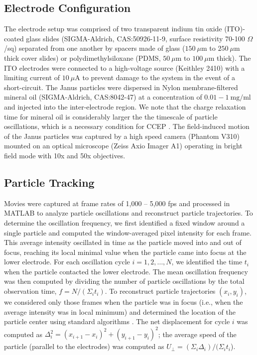 \subsection{Electrode Configuration}

The electrode setup was comprised of two transparent  indium tin oxide (ITO)-coated glass slides (SIGMA-Aldrich, CAS:50926-11-9, surface resistivity 70-100 $\Omega$/sq) separated from one another by spacers made of glass ($150~\mu\text{m}$ to $250~\mu\text{m}$ thick cover slides) or polydimethylsiloxane (PDMS, $50~\mu\text{m}$ to $100~\mu\text{m}$ thick).
The ITO electrodes were connected to a high-voltage source (Keithley 2410) with a limiting current of $10~\mu\text{A}$ to prevent damage to the system in the event of a short-circuit.
The Janus particles were dispersed in Nylon membrane-filtered mineral oil (SIGMA-Aldrich, CAS:8042-47) at a concentration of $0.01-1~\text{mg/ml}$ and injected into the inter-electrode region.
We note that the charge relaxation time for mineral oil is considerably larger the the timescale of particle oscillations, which is a necessary condition for CCEP \cite{cartier2014microfluidic}. 
The field-induced motion of the Janus particles was captured by a high speed camera (Phantom V310) mounted on an optical microscope (Zeiss Axio Imager A1) operating in bright field mode with 10x and 50x objectives.

\subsection{Particle Tracking}

Movies were captured at frame rates of 1,000 -- 5,000 fps and processed in MATLAB to analyze particle oscillations and reconstruct particle trajectories. 
To determine the oscillation frequency, we first identified a fixed window around a single particle and computed the window-averaged pixel intensity for each frame.
This average intensity oscillated in time as the particle moved into and out of focus, reaching its local minimal value when the particle came into focus at the lower electrode.
For each oscillation cycle $i=1,2,\dots, N$, we identified the time $t_i$ when the particle contacted the lower electrode. 
The mean oscillation frequency was then computed by dividing the number of particle oscillations by the total observation time, $f= N / (\Sigma_i t_i)$.
To reconstruct particle trajectories $(x_i,y_i)$, we considered only those frames when the particle was in focus (i.e., when the average intensity was in local minimum) and determined the location of the particle center using standard algorithms \cite{Track}.
The net displacement for cycle $i$ was computed as $\Delta_i^2 = (x_{i+1} - x_i)^2 + (y_{i+1}-y_i)^2$; the average speed of the particle (parallel to the electrodes) was computed as $U_{\perp} = (\Sigma_i \Delta_i)  /  (\Sigma_i t_i$).

